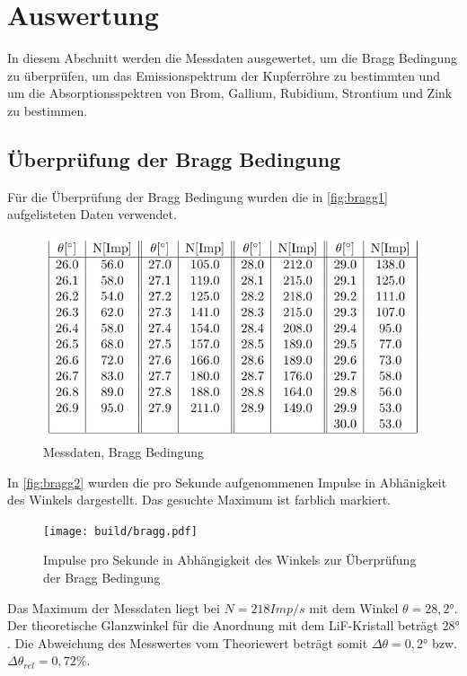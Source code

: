 \section{Auswertung}
\label{sec:Auswertung}
In diesem Abschnitt werden die Messdaten ausgewertet, um die Bragg Bedingung zu überprüfen, um das Emissionspektrum der Kupferröhre zu bestimmten und um die Absorptionsspektren von Brom, Gallium, Rubidium, Strontium und Zink zu bestimmen.
\subsection{Überprüfung der Bragg Bedingung}
Für die Überprüfung der Bragg Bedingung wurden die in \autoref{fig:bragg1} aufgelisteten Daten verwendet.
\begin{figure}[H]
  \centering
  \includegraphics{daten/bragg.JPG}
  \caption{Messdaten, Bragg Bedingung}
  \label{fig:bragg1}
\end{figure}
In \autoref{fig:bragg2} wurden die pro Sekunde aufgenommenen Impulse in Abhänigkeit des Winkels dargestellt. Das gesuchte Maximum ist farblich markiert.
\begin{figure}[H]
  \centering
  \texttt{[image: build/bragg.pdf]}
  \caption{Impulse pro Sekunde in Abhängigkeit des Winkels zur Überprüfung der Bragg Bedingung}
  \label{fig:bragg2}
\end{figure}
\noindent
Das Maximum der Messdaten liegt bei $N=218 Imp/s$ mit dem Winkel $\theta=28,2°$. Der theoretische Glanzwinkel für die Anordnung mit dem LiF-Kristall beträgt $28°$. Die Abweichung des Messwertes vom Theoriewert beträgt somit $\Delta \theta=0,2°$ bzw. $\Delta \theta_{rel}=0,72\%$.
